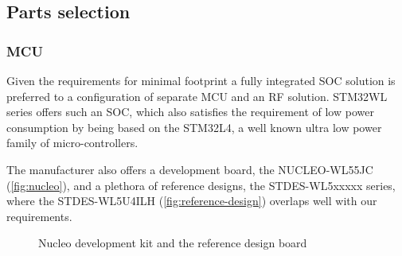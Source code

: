 \subsection{Parts selection}
\subsubsection{MCU}
Given the requirements for minimal footprint a fully integrated SOC solution is preferred to a configuration of separate MCU and an RF solution. STM32WL series offers such an SOC, which also satisfies the requirement of low power consumption by being based on the STM32L4, a well known ultra low power family of micro-controllers.

The manufacturer also offers a development board, the NUCLEO-WL55JC (\ref{fig:nucleo}), and a plethora of reference designs, the STDES-WL5xxxxx series, where the STDES-WL5U4ILH (\ref{fig:reference-design}) overlaps well with our requirements.

\begin{figure}
    \centering
    \caption{\label{fig:nucleo-and-reference} Nucleo development kit and the reference design board}
\end{figure}

